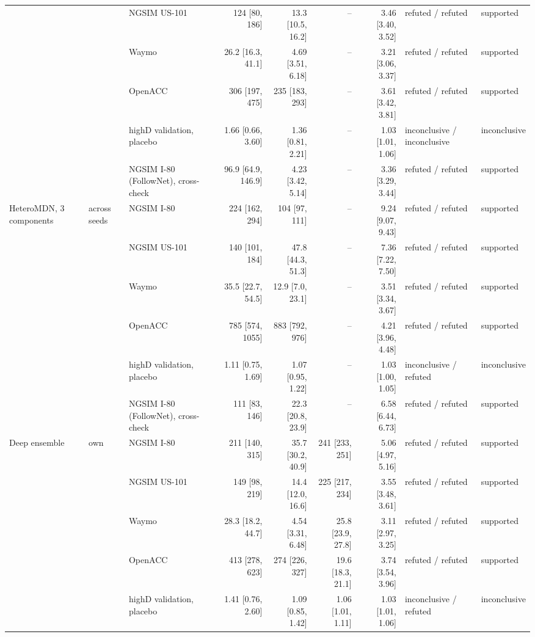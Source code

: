 \begin{longtable}{lllrrrrll}
 &  & NGSIM US-101 & 124 [80, 186] & 13.3 [10.5, 16.2] & -- & 3.46 [3.40, 3.52] & refuted / refuted & supported \\
 &  & Waymo & 26.2 [16.3, 41.1] & 4.69 [3.51, 6.18] & -- & 3.21 [3.06, 3.37] & refuted / refuted & supported \\
 &  & OpenACC & 306 [197, 475] & 235 [183, 293] & -- & 3.61 [3.42, 3.81] & refuted / refuted & supported \\
 &  & highD validation, placebo & 1.66 [0.66, 3.60] & 1.36 [0.81, 2.21] & -- & 1.03 [1.01, 1.06] & inconclusive / inconclusive & inconclusive \\
 &  & NGSIM I-80 (FollowNet), cross-check & 96.9 [64.9, 146.9] & 4.23 [3.42, 5.14] & -- & 3.36 [3.29, 3.44] & refuted / refuted & supported \\
\midrule
HeteroMDN, 3 components & across seeds & NGSIM I-80 & 224 [162, 294] & 104 [97, 111] & -- & 9.24 [9.07, 9.43] & refuted / refuted & supported \\
 &  & NGSIM US-101 & 140 [101, 184] & 47.8 [44.3, 51.3] & -- & 7.36 [7.22, 7.50] & refuted / refuted & supported \\
 &  & Waymo & 35.5 [22.7, 54.5] & 12.9 [7.0, 23.1] & -- & 3.51 [3.34, 3.67] & refuted / refuted & supported \\
 &  & OpenACC & 785 [574, 1055] & 883 [792, 976] & -- & 4.21 [3.96, 4.48] & refuted / refuted & supported \\
 &  & highD validation, placebo & 1.11 [0.75, 1.69] & 1.07 [0.95, 1.22] & -- & 1.03 [1.00, 1.05] & inconclusive / refuted & inconclusive \\
 &  & NGSIM I-80 (FollowNet), cross-check & 111 [83, 146] & 22.3 [20.8, 23.9] & -- & 6.58 [6.44, 6.73] & refuted / refuted & supported \\
\midrule
Deep ensemble & own & NGSIM I-80 & 211 [140, 315] & 35.7 [30.2, 40.9] & 241 [233, 251] & 5.06 [4.97, 5.16] & refuted / refuted & supported \\
 &  & NGSIM US-101 & 149 [98, 219] & 14.4 [12.0, 16.6] & 225 [217, 234] & 3.55 [3.48, 3.61] & refuted / refuted & supported \\
 &  & Waymo & 28.3 [18.2, 44.7] & 4.54 [3.31, 6.48] & 25.8 [23.9, 27.8] & 3.11 [2.97, 3.25] & refuted / refuted & supported \\
 &  & OpenACC & 413 [278, 623] & 274 [226, 327] & 19.6 [18.3, 21.1] & 3.74 [3.54, 3.96] & refuted / refuted & supported \\
 &  & highD validation, placebo & 1.41 [0.76, 2.60] & 1.09 [0.85, 1.42] & 1.06 [1.01, 1.11] & 1.03 [1.01, 1.06] & inconclusive / refuted & inconclusive \\

\end{longtable}
